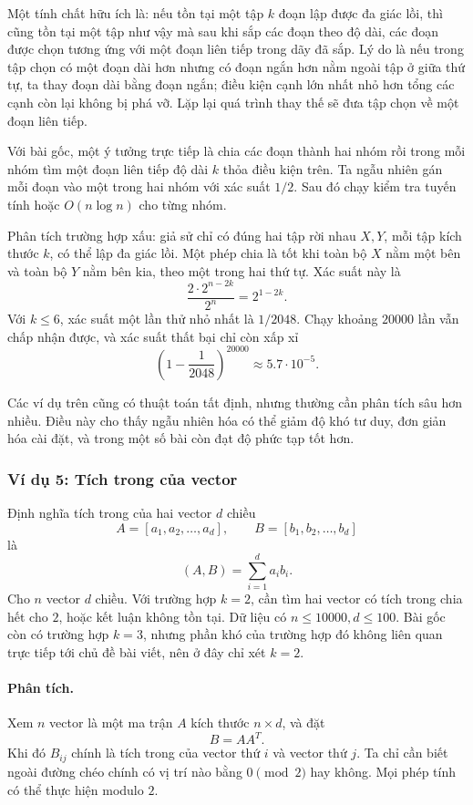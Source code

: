 \documentclass[11pt]{article}
\begin{document}
Một tính chất hữu ích là: nếu tồn tại một tập \(k\) đoạn lập được đa giác lồi,
thì cũng tồn tại một tập như vậy mà sau khi sắp các đoạn theo độ dài, các đoạn
được chọn tương ứng với một đoạn liên tiếp trong dãy đã sắp. Lý do là nếu trong
tập chọn có một đoạn dài hơn nhưng có đoạn ngắn hơn nằm ngoài tập ở giữa thứ tự,
ta thay đoạn dài bằng đoạn ngắn; điều kiện cạnh lớn nhất nhỏ hơn tổng các cạnh
còn lại không bị phá vỡ. Lặp lại quá trình thay thế sẽ đưa tập chọn về một đoạn
liên tiếp.

Với bài gốc, một ý tưởng trực tiếp là chia các đoạn thành hai nhóm rồi trong mỗi
nhóm tìm một đoạn liên tiếp độ dài \(k\) thỏa điều kiện trên. Ta ngẫu nhiên gán
mỗi đoạn vào một trong hai nhóm với xác suất \(1/2\). Sau đó chạy kiểm tra tuyến
tính hoặc \(O(n\log n)\) cho từng nhóm.

Phân tích trường hợp xấu: giả sử chỉ có đúng hai tập rời nhau \(X,Y\), mỗi tập
kích thước \(k\), có thể lập đa giác lồi. Một phép chia là tốt khi toàn bộ \(X\)
nằm một bên và toàn bộ \(Y\) nằm bên kia, theo một trong hai thứ tự. Xác suất
này là
\[
  \frac{2\cdot 2^{n-2k}}{2^n} = 2^{1-2k}.
\]
Với \(k\le 6\), xác suất một lần thử nhỏ nhất là \(1/2048\). Chạy khoảng
\(20000\) lần vẫn chấp nhận được, và xác suất thất bại chỉ còn xấp xỉ
\[
  \left(1-\frac1{2048}\right)^{20000}\approx 5.7\cdot 10^{-5}.
\]

Các ví dụ trên cũng có thuật toán tất định, nhưng thường cần phân tích sâu hơn
nhiều. Điều này cho thấy ngẫu nhiên hóa có thể giảm độ khó tư duy, đơn giản hóa
cài đặt, và trong một số bài còn đạt độ phức tạp tốt hơn.

\subsubsection{Ví dụ 5: Tích trong của vector}

Định nghĩa tích trong của hai vector \(d\) chiều
\[
  A=[a_1,a_2,\ldots,a_d],\qquad B=[b_1,b_2,\ldots,b_d]
\]
là
\[
  (A,B)=\sum_{i=1}^d a_ib_i.
\]
Cho \(n\) vector \(d\) chiều. Với trường hợp \(k=2\), cần tìm hai vector có tích
trong chia hết cho \(2\), hoặc kết luận không tồn tại. Dữ liệu có
\(n\le 10000,d\le 100\). Bài gốc còn có trường hợp \(k=3\), nhưng phần khó của
trường hợp đó không liên quan trực tiếp tới chủ đề bài viết, nên ở đây chỉ xét
\(k=2\).

\paragraph{Phân tích.}
Xem \(n\) vector là một ma trận \(A\) kích thước \(n\times d\), và đặt
\[
  B=A A^T.
\]
Khi đó \(B_{ij}\) chính là tích trong của vector thứ \(i\) và vector thứ \(j\).
Ta chỉ cần biết ngoài đường chéo chính có vị trí nào bằng \(0\pmod 2\) hay
không. Mọi phép tính có thể thực hiện modulo \(2\).
\end{document}
